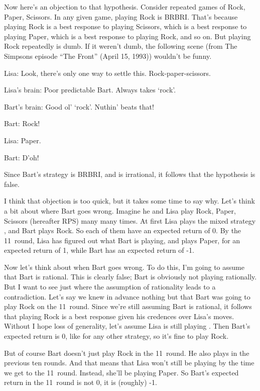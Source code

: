 Now here's an objection to that hypothesis. Consider repeated games of Rock, Paper, Scissors. In any given game, playing Rock is BRBRI. That's because playing Rock is a best response to playing Scissors, which is a best response to playing Paper, which is a best response to playing Rock, and so on. But playing Rock repeatedly is dumb. If it weren't dumb, the following scene (from The Simpsons episode ``The Front'' (April 15, 1993)) wouldn't be funny.
\medskip

   Lisa:  Look, there's only one way to settle this.  Rock-paper-scissors. 

   Lisa's brain: Poor predictable Bart.  Always takes `rock'. 

   Bart's brain: Good ol' `rock'.  Nuthin' beats that! 

   Bart:  Rock! 

   Lisa:  Paper. 

   Bart:  D'oh! 

\medskip
\noindent Since Bart's strategy is BRBRI, and is irrational, it follows that the hypothesis is false.

I think that objection is too quick, but it takes some time to say why. Let's think a bit about where Bart goes wrong. Imagine he and Lisa play Rock, Paper, Scissors (hereafter RPS) many many times. At first Lisa plays the mixed strategy , and Bart plays Rock. So each of them have an expected return of 0. By the 11\th\ round, Lisa has figured out what Bart is playing, and plays Paper, for an expected return of 1, while Bart has an expected return of -1.

Now let's think about when Bart goes wrong. To do this, I'm going to assume that Bart is rational. This is clearly false; Bart is obviously not playing rationally. But I want to see just where the assumption of rationality leads to a contradiction. Let's say we knew in advance nothing but that Bart was going to play Rock on the 11\sth\ round. Since we're still assuming Bart is rational, it follows that playing Rock is a best response given his credences over Lisa's moves. Without I hope loss of generality, let's assume Lisa is still playing . Then Bart's expected return is 0, like for any other strategy, so it's fine to play Rock.

But of course Bart doesn't just play Rock in the 11\sth\ round. He also plays in the previous ten rounds. And that means that Lisa won't still be playing  by the time we get to the 11\sth\ round. Instead, she'll be playing Paper. So Bart's expected return in the 11\sth\ round is not 0, it is (roughly) -1.

